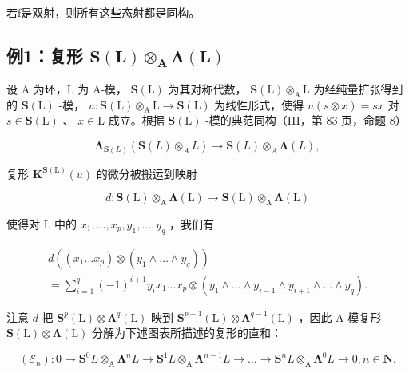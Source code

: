 若f是双射，则所有这些态射都是同构。

\subsection{\texorpdfstring{例1：复形 \(\mathbf{S}(\mathbf{L})\otimes_{\mathbf{A}}\boldsymbol{\Lambda}(\mathbf{L})\)}{例1：复形 \textbackslash mathbf\{S\}(\textbackslash mathbf\{L\})\textbackslash otimes\_\{\textbackslash mathbf\{A\}\}\textbackslash boldsymbol\{\textbackslash Lambda\}(\textbackslash mathbf\{L\})}}

设 A 为环，L 为 A-模， \(\mathbf{S}(\mathrm{L})\) 为其对称代数， \(\mathbf{S}(\mathrm{L}) \otimes_{\mathrm{A}} \mathrm{L}\) 为经纯量扩张得到的 \(\mathbf{S}(\mathrm{L})\) -模， \(u: \mathbf{S}(\mathrm{L}) \otimes_{\mathrm{A}} \mathrm{L} \to \mathbf{S}(\mathrm{L})\) 为线性形式，使得 \(u(s \otimes x) = sx\) 对 \(s \in \mathbf{S}(\mathrm{L})\) 、 \(x \in \mathrm{L}\) 成立。根据 \(\mathbf{S}(\mathrm{L})\) -模的典范同构（III，第 83 页，命题 8）

\[
\boldsymbol {\Lambda} _ {\mathbf {S} (L)} (\mathbf {S} (L) \otimes_ {A} L) \rightarrow \mathbf {S} (L) \otimes_ {A} \boldsymbol {\Lambda} (L),
\]

复形 \(\mathbf{K}^{\mathbf{S}(\mathrm{L})}(u)\) 的微分被搬运到映射

\[
d: \mathbf {S} (\mathrm{L}) \otimes_ {\mathrm{A}} \boldsymbol {\Lambda} (\mathrm{L}) \rightarrow \mathbf {S} (\mathrm{L}) \otimes_ {\mathrm{A}} \boldsymbol {\Lambda} (\mathrm{L})
\]

使得对 L 中的 \(x_{1},\ldots,x_{p},y_{1},\ldots,y_{q}\) ，我们有

\[
\begin{array}{l} d \left(\left(x _ {1} \dots x _ {p}\right) \otimes \left(y _ {1} \wedge \dots \wedge y _ {q}\right)\right) \\ = \sum_ {i = 1} ^ {q} (- 1) ^ {i + 1} y _ {i} x _ {1} \dots x _ {p} \otimes \left(y _ {1} \wedge \dots \wedge y _ {i - 1} \wedge y _ {i + 1} \wedge \dots \wedge y _ {q}\right). \end{array}
\]

注意 \(d\) 把 \(\mathbf{S}^{p}(\mathrm{L})\otimes\symbf{\Lambda}^{q}(\mathrm{L})\) 映到 \(\mathbf{S}^{p+1}(\mathrm{L})\otimes\symbf{\Lambda}^{q-1}(\mathrm{L})\) ，因此 A-模复形 \(\mathbf{S}(\mathrm{L})\otimes\symbf{\Lambda}(\mathrm{L})\) 分解为下述图表所描述的复形的直和：

\[
\left(\mathcal {E} _ {n}\right): 0 \rightarrow \mathbf {S} ^ {0} L \otimes_ {\mathrm{A}} \boldsymbol {\Lambda} ^ {n} L \rightarrow \mathbf {S} ^ {1} L \otimes_ {\mathrm{A}} \boldsymbol {\Lambda} ^ {n - 1} L \rightarrow \dots \rightarrow \mathbf {S} ^ {n} L \otimes_ {\mathrm{A}} \boldsymbol {\Lambda} ^ {0} L \rightarrow 0, n \in \mathbf {N}.
\]

